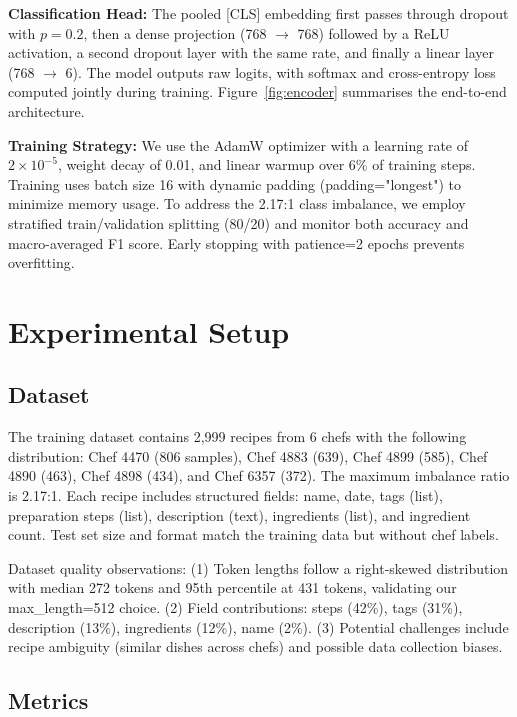 \documentclass[twocolumn,10pt]{article}
\begin{document}
\textbf{Classification Head:} The pooled [CLS] embedding first passes through dropout with $p=0.2$, then a dense projection (768 $\rightarrow$ 768) followed by a ReLU activation, a second dropout layer with the same rate, and finally a linear layer (768 $\rightarrow$ 6). The model outputs raw logits, with softmax and cross-entropy loss computed jointly during training. Figure~\ref{fig:encoder} summarises the end-to-end architecture.

\textbf{Training Strategy:} We use the AdamW optimizer with a learning rate of $2 \times 10^{-5}$, weight decay of 0.01, and linear warmup over 6\% of training steps. Training uses batch size 16 with dynamic padding (padding="longest") to minimize memory usage. To address the 2.17:1 class imbalance, we employ stratified train/validation splitting (80/20) and monitor both accuracy and macro-averaged F1 score. Early stopping with patience=2 epochs prevents overfitting.

\section{Experimental Setup}
 
\subsection{Dataset}

The training dataset contains 2,999 recipes from 6 chefs with the following distribution: Chef 4470 (806 samples), Chef 4883 (639), Chef 4899 (585), Chef 4890 (463), Chef 4898 (434), and Chef 6357 (372). The maximum imbalance ratio is 2.17:1. Each recipe includes structured fields: name, date, tags (list), preparation steps (list), description (text), ingredients (list), and ingredient count. Test set size and format match the training data but without chef labels.

Dataset quality observations: (1) Token lengths follow a right-skewed distribution with median 272 tokens and 95th percentile at 431 tokens, validating our max\_length=512 choice. (2) Field contributions: steps (42\%), tags (31\%), description (13\%), ingredients (12\%), name (2\%). (3) Potential challenges include recipe ambiguity (similar dishes across chefs) and possible data collection biases.

\subsection{Metrics}
\end{document}
